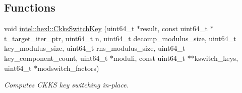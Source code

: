 \subsection*{Functions}
\begin{DoxyCompactItemize}
\item 
void \hyperlink{namespaceintel_1_1hexl_ae983051ff4c3321db4db4569d7fbe796}{intel\+::hexl\+::\+Ckks\+Switch\+Key} (uint64\+\_\+t $\ast$result, const uint64\+\_\+t $\ast$t\+\_\+target\+\_\+iter\+\_\+ptr, uint64\+\_\+t n, uint64\+\_\+t decomp\+\_\+modulus\+\_\+size, uint64\+\_\+t key\+\_\+modulus\+\_\+size, uint64\+\_\+t rns\+\_\+modulus\+\_\+size, uint64\+\_\+t key\+\_\+component\+\_\+count, uint64\+\_\+t $\ast$moduli, const uint64\+\_\+t $\ast$$\ast$kswitch\+\_\+keys, uint64\+\_\+t $\ast$modswitch\+\_\+factors)
\begin{DoxyCompactList}\small\item\em Computes C\+K\+KS key switching in-\/place. \end{DoxyCompactList}\end{DoxyCompactItemize}
